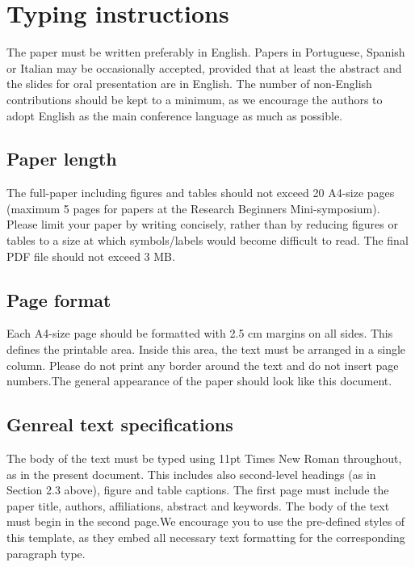 \documentclass{cilamce19}
\begin{document}
\section{Typing instructions}

The paper must be written preferably in English. Papers in Portuguese, Spanish or Italian may be occasionally accepted, provided that at least the abstract and the slides for oral presentation are in English. The number of non-English contributions should be kept to a minimum, as we encourage the authors to adopt English as the main conference language as much as possible.

 
 


\subsection{Paper length} 
The full-paper including figures and tables should not exceed 20 A4-size pages (maximum 5 pages for papers at the Research Beginners Mini-symposium). Please limit your paper by writing concisely, rather than by reducing figures or tables to a size at which symbols/labels would become difficult to read. The final PDF file should not exceed 3 MB.



\subsection{Page format}
Each A4-size page should be formatted with 2.5 cm margins on all sides. This defines the printable area. Inside this area, the text must be arranged in a single column. Please do not print any border around the text and do not insert page numbers.The general appearance of the paper should look like this document.


\subsection{Genreal text specifications}
The body of the text must be typed using 11pt Times New Roman throughout, as in the present document. This includes also second-level headings (as in Section 2.3 above), figure and table captions. The first page must include the paper title, authors, affiliations, abstract and keywords. The body of the text must begin in the second page.We encourage you to use the pre-defined styles of this template, as they embed all necessary text formatting for the corresponding paragraph type.
\end{document}
